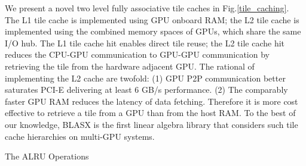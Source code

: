 \documentclass[conference]{IEEEtran}
\begin{document}
We present a novel two level fully associative tile caches in Fig.\ref{tile_caching}. 
The L1 tile cache is implemented using GPU onboard RAM; the L2 tile cache is implemented using the combined 
memory spaces of GPUs, which share the same I/O hub. The L1 tile cache hit enables direct tile 
reuse; the L2 tile cache hit reduces the CPU-GPU communication to GPU-GPU communication by 
retrieving the tile from the hardware adjacent GPU. The rational of implementing the L2 cache 
are twofold: 
(1) GPU P2P communication better saturates PCI-E delivering at least 6 GB/s performance. \cite{P2P} 
(2) The comparably faster GPU RAM reduces the latency of data fetching. 
Therefore it is more cost effective to retrieve a tile from a GPU than from the host RAM. 
To the best of our knowledge, BLASX is the first linear algebra library that considers such 
tile cache hierarchies on multi-GPU systems.

\vspace{-0.1in}
\begin{algorithm}
\caption{The ALRU Operations}
\label{AALRU_alg}
\DontPrintSemicolon
{}


\end{algorithm}
\vspace{-0.15in}
\end{document}
